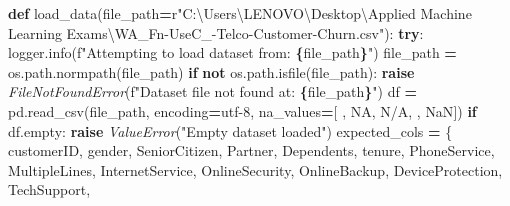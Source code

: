 \documentclass[preprint, 3p,
authoryear]{elsarticle} %
\newenvironment{Shaded}{\begin{snugshade}}{\end{snugshade}}
\newcommand{\ControlFlowTok}[1]{\textcolor[rgb]{0.13,0.29,0.53}{\textbf{#1}}}
\newcommand{\KeywordTok}[1]{\textcolor[rgb]{0.13,0.29,0.53}{\textbf{#1}}}
\newcommand{\NormalTok}[1]{#1}
\newcommand{\OperatorTok}[1]{\textcolor[rgb]{0.81,0.36,0.00}{\textbf{#1}}}
\newcommand{\PreprocessorTok}[1]{\textcolor[rgb]{0.56,0.35,0.01}{\textit{#1}}}
\newcommand{\SpecialCharTok}[1]{\textcolor[rgb]{0.81,0.36,0.00}{\textbf{#1}}}
\newcommand{\SpecialStringTok}[1]{\textcolor[rgb]{0.31,0.60,0.02}{#1}}
\newcommand{\StringTok}[1]{\textcolor[rgb]{0.31,0.60,0.02}{#1}}
\newcommand{\VerbatimStringTok}[1]{\textcolor[rgb]{0.31,0.60,0.02}{#1}}
\begin{document}
\begin{Shaded}
\begin{Highlighting}[]
\KeywordTok{def}\NormalTok{ load\_data(file\_path}\OperatorTok{=}\VerbatimStringTok{r"C:\textbackslash{}Users\textbackslash{}LENOVO\textbackslash{}Desktop\textbackslash{}Applied Machine Learning Exams\textbackslash{}WA\_Fn{-}UseC\_{-}Telco{-}Customer{-}Churn.csv"}\NormalTok{):}
    \ControlFlowTok{try}\NormalTok{:}
\NormalTok{        logger.info(}\SpecialStringTok{f"Attempting to load dataset from: }\SpecialCharTok{\{}\NormalTok{file\_path}\SpecialCharTok{\}}\SpecialStringTok{"}\NormalTok{)}
\NormalTok{        file\_path }\OperatorTok{=}\NormalTok{ os.path.normpath(file\_path)}
        \ControlFlowTok{if} \KeywordTok{not}\NormalTok{ os.path.isfile(file\_path):}
            \ControlFlowTok{raise} \PreprocessorTok{FileNotFoundError}\NormalTok{(}\SpecialStringTok{f"Dataset file not found at: }\SpecialCharTok{\{}\NormalTok{file\_path}\SpecialCharTok{\}}\SpecialStringTok{"}\NormalTok{)}
\NormalTok{        df }\OperatorTok{=}\NormalTok{ pd.read\_csv(file\_path, encoding}\OperatorTok{=}\StringTok{\textquotesingle{}utf{-}8\textquotesingle{}}\NormalTok{, na\_values}\OperatorTok{=}\NormalTok{[}\StringTok{\textquotesingle{} \textquotesingle{}}\NormalTok{, }\StringTok{\textquotesingle{}NA\textquotesingle{}}\NormalTok{, }\StringTok{\textquotesingle{}N/A\textquotesingle{}}\NormalTok{, }\StringTok{\textquotesingle{}\textquotesingle{}}\NormalTok{, }\StringTok{\textquotesingle{}NaN\textquotesingle{}}\NormalTok{])}
        \ControlFlowTok{if}\NormalTok{ df.empty:}
            \ControlFlowTok{raise} \PreprocessorTok{ValueError}\NormalTok{(}\StringTok{"Empty dataset loaded"}\NormalTok{)}
\NormalTok{        expected\_cols }\OperatorTok{=}\NormalTok{ \{}
            \StringTok{\textquotesingle{}customerID\textquotesingle{}}\NormalTok{, }\StringTok{\textquotesingle{}gender\textquotesingle{}}\NormalTok{, }\StringTok{\textquotesingle{}SeniorCitizen\textquotesingle{}}\NormalTok{, }\StringTok{\textquotesingle{}Partner\textquotesingle{}}\NormalTok{, }\StringTok{\textquotesingle{}Dependents\textquotesingle{}}\NormalTok{,}
            \StringTok{\textquotesingle{}tenure\textquotesingle{}}\NormalTok{, }\StringTok{\textquotesingle{}PhoneService\textquotesingle{}}\NormalTok{, }\StringTok{\textquotesingle{}MultipleLines\textquotesingle{}}\NormalTok{, }\StringTok{\textquotesingle{}InternetService\textquotesingle{}}\NormalTok{,}
            \StringTok{\textquotesingle{}OnlineSecurity\textquotesingle{}}\NormalTok{, }\StringTok{\textquotesingle{}OnlineBackup\textquotesingle{}}\NormalTok{, }\StringTok{\textquotesingle{}DeviceProtection\textquotesingle{}}\NormalTok{, }\StringTok{\textquotesingle{}TechSupport\textquotesingle{}}\NormalTok{,}

\end{Highlighting}
\end{Shaded}
\end{document}
